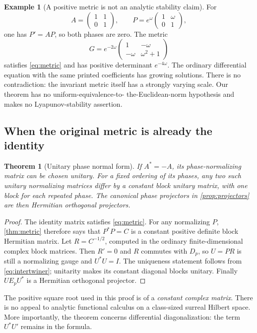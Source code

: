 \documentclass[11pt,a4paper]{article}
\numberwithin{equation}{section}
\newtheorem{theorem}{Theorem}[section]
\theoremstyle{definition}
\newtheorem{example}[example]{Example}
\theoremstyle{remark}
\begin{document}
\begin{example}[A positive metric is not an analytic stability claim]
For
\[
 A=\begin{pmatrix}1&1\\0&1\end{pmatrix},\qquad
 P=e^{\omega}\begin{pmatrix}1&\omega\\0&1\end{pmatrix},
\]
one has $P'=AP$, so both phases are zero. The metric
\[
 G=e^{-2\omega}\begin{pmatrix}1&-\omega\\-\omega&\omega^2+1\end{pmatrix}
\]
satisfies \eqref{eq:metric} and has positive determinant $e^{-4\omega}$.
The ordinary differential equation with the same printed coefficients has
growing solutions. There is no contradiction: the invariant metric itself
has a strongly varying scale. Our theorem has no uniform-equivalence-to-
the-Euclidean-norm hypothesis and makes no Lyapunov-stability assertion.
\end{example}

\subsection{When the original metric is already the identity}
\begin{theorem}[Unitary phase normal form]\label{thm:unitary}
If $A^*=-A$, its phase-normalizing matrix can be chosen unitary. For a fixed
ordering of its phases, any two such unitary normalizing matrices differ
by a constant block unitary matrix, with one block for each repeated phase.
The canonical phase projectors in \cref{prop:projectors} are then
Hermitian orthogonal projectors.
\end{theorem}
\begin{proof}
The identity matrix satisfies \eqref{eq:metric}. For any normalizing $P$,
\cref{thm:metric} therefore says that $P^*P=C$ is a constant positive
definite block Hermitian matrix. Let $R=C^{-1/2}$, computed in the ordinary
finite-dimensional complex block matrices. Then $R'=0$ and $R$ commutes
with $D_p$, so $U=PR$ is still a normalizing gauge and $U^*U=I$.
The uniqueness statement follows from \eqref{eq:intertwiner}; unitarity
makes its constant diagonal blocks unitary. Finally $UE_pU^*$ is a
Hermitian orthogonal projector.
\end{proof}

The positive square root used in this proof is of a \emph{constant complex
matrix}. There is no appeal to analytic functional calculus on a
class-sized surreal Hilbert space. More importantly, the theorem concerns
differential diagonalization: the term $U^*U'$ remains in the formula.
\end{document}
